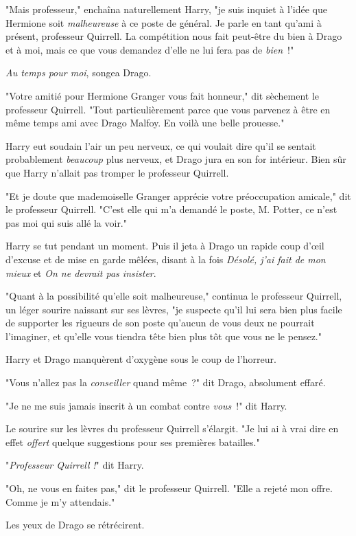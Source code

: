 "Mais professeur," enchaîna naturellement Harry, "je suis inquiet à l'idée que Hermione soit \emph{malheureuse} à ce poste de général. Je parle en tant qu'ami à présent, professeur Quirrell. La compétition nous fait peut-être du bien à Drago et à moi, mais ce que vous demandez d'elle ne lui fera pas de \emph{bien}~!"

\emph{Au temps pour moi}, songea Drago.

"Votre amitié pour Hermione Granger vous fait honneur," dit sèchement le professeur Quirrell. "Tout particulièrement parce que vous parvenez à être en même temps ami avec Drago Malfoy. En voilà une belle prouesse."

Harry eut soudain l'air un peu nerveux, ce qui voulait dire qu'il se sentait probablement \emph{beaucoup} plus nerveux, et Drago jura en son for intérieur. Bien sûr que Harry n'allait pas tromper le professeur Quirrell.

"Et je doute que mademoiselle Granger apprécie votre préoccupation amicale," dit le professeur Quirrell. "C'est elle qui m'a demandé le poste, M. Potter, ce n'est pas moi qui suis allé la voir."

Harry se tut pendant un moment. Puis il jeta à Drago un rapide coup d'œil d'excuse et de mise en garde mêlées, disant à la fois \emph{Désolé, j'ai fait de mon mieux} et \emph{On ne devrait pas insister}.

"Quant à la possibilité qu'elle soit malheureuse," continua le professeur Quirrell, un léger sourire naissant sur ses lèvres, "je suspecte qu'il lui sera bien plus facile de supporter les rigueurs de son poste qu'aucun de vous deux ne pourrait l'imaginer, et qu'elle vous tiendra tête bien plus tôt que vous ne le pensez."

Harry et Drago manquèrent d'oxygène sous le coup de l'horreur.

"Vous n'allez pas la \emph{conseiller} quand même~?" dit Drago, absolument effaré.

"Je ne me suis jamais inscrit à un combat contre \emph{vous}~!" dit Harry.

Le sourire sur les lèvres du professeur Quirrell s'élargit. "Je lui ai à vrai dire en effet \emph{offert} quelque suggestions pour ses premières batailles."

"\emph{Professeur Quirrell} \emph{!}" dit Harry.

"Oh, ne vous en faites pas," dit le professeur Quirrell. "Elle a rejeté mon offre. Comme je m'y attendais."

Les yeux de Drago se rétrécirent.

